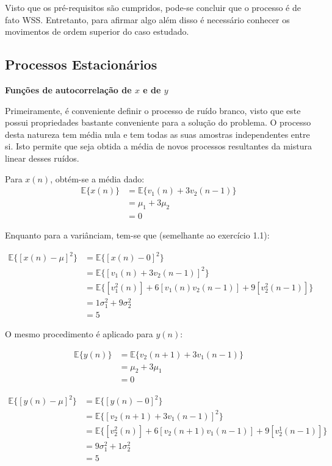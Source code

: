 Visto que os pré-requisitos são cumpridos, pode-se concluir que o processo é de fato WSS. Entretanto, para afirmar algo além disso é necessário conhecer os movimentos de ordem superior do caso estudado.


\subsection{Processos Estacionários} %
    
\textbf{Funções de autocorrelação de $x$ e de $y$}

Primeiramente, é conveniente definir o processo de ruído branco, visto que este possui propriedades bastante conveniente para a solução do problema. O processo desta natureza tem média nula e tem todas as suas amostras independentes entre si. Isto permite que seja obtida a média de novos processos resultantes da mistura linear desses ruídos.

Para $x(n)$, obtém-se a média dado:
\begin{align*}
    \mathbb{E}\{x(n)\} &= \mathbb{E}\{v_{1}(n) + 3v_{2}(n-1)\} \\
    & = \mu_{1} + 3\mu_{2} \\
    & = 0 
\end{align*}

Enquanto para a variânciam, tem-se que (semelhante ao exercício 1.1):

\begin{align*}
    \mathbb{E}\{[x(n) - \mu]^{2}\} &= \mathbb{E}\{[x(n) - 0]^{2}\}\\
    &= \mathbb{E}\{[v_{1}(n) + 3v_{2}(n-1)]^{2}\} \\
    &= \mathbb{E}\{ [v^{2}_{1}(n)] + 6[v_{1}(n)v_{2}(n-1)] + 9[v^{2}_{2}(n-1)]\} \\
    &= 1 \sigma^{2}_{1} + 9 \sigma^{2}_{2} \\
    &= 5
\end{align*}

O mesmo procedimento é aplicado para $y(n)$:

\begin{align*}
    \mathbb{E}\{y(n)\} &= \mathbb{E}\{v_{2}(n+1) + 3v_{1}(n-1)\} \\
    &= \mu_{2} + 3\mu_{1} \\
    &= 0
\end{align*}

\begin{align*}
    \mathbb{E}\{[y(n) - \mu]^{2}\} &= \mathbb{E}\{[y(n) - 0]^{2}\} \\
    &= \mathbb{E}\{[v_{2}(n+1) + 3v_{1}(n-1)]^{2}\} \\
    &= \mathbb{E}\{ [v^{2}_{2}(n)] + 6[v_{2}(n+1)v_{1}(n-1)] + 9[v^{1}_{2}(n-1)]\} \\
    &= 9 \sigma^{2}_{1} + 1 \sigma^{2}_{2} \\
    &= 5
\end{align*}

